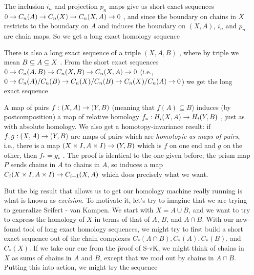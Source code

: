 
The inclusion $i_n$ and projection  $p_n$ maps give us short exact sequences \hhsk
$0\rightarrow C_n(A)\rightarrow C_n(X) \rightarrow C_n(X,A)\rightarrow 0$ \hhsk, and since the boundary on chains
in $X$ restricts to the boundary on $A$ and induces the boundary on $(X,A)$,
$i_n$ and $p_n$ are chain maps. So we get a long exact homology sequence

\ssk


\ssk

There is also a long exact sequence of a triple $(X,A,B)$ , where by triple we
mean $B\subseteq A\subseteq X$ . From the short exact sequences 
\hhsk $0\rightarrow C_n(A,B) \rightarrow C_n(X,B) \rightarrow C_n(X,A)\rightarrow 0$ \hhsk
(i.e., $0\rightarrow C_n(A)/C_n(B) \rightarrow C_n(X)/C_n(B) \rightarrow C_n(X)/C_n(A)\rightarrow 0$) we get the
long exact sequence 

\ssk


\msk

A map of pairs $f: (X,A) \rightarrow (Y,B)$ (meaning that $f(A)\subseteq B$)
induces (by postcomposition) a map of relative homology $f_*:H_i(X,A)\rightarrow H_i(Y,B)$ , just as with 
absolute homology.
We also get a homotopy-invariance result: if $f,g: (X,A) \rightarrow (Y,B)$ are maps of pairs
which are {\it homotopic as maps of pairs},
i.e., there is a map $(X\times I,A\times I)\rightarrow (Y,B)$ which is $f$ on one end and $g$
on the other, then $f_*=g_*$ . The proof is identical to the one given before; the prism map 
$P$ sends chains in $A$ to chains in $A$, so induces a map $C_i(X\times I,A\times I)\rightarrow C_{i+1}(X,A)$
which does precisely what we want.

\bsk

But the big result that allows us to get our homology machine really running is what is
known as {\it excision}. To motivate it, let's try to imagine that we are trying to 
generalize Seifert - van Kampen. We start with $X=A\cup B$, and we want to try to 
express the homology of $X$ in terms of that of $A$, $B$, and $A\cap B$. With our
new-found tool of long exact homology sequences, we might try to first build
a short exact sequence out of the chain complexes $C_*(A\cap B), C_*(A), C_*(B)$, and $C_*(X)$.
If we take our cue from the \u{proof} of S-vK, we might think of chains in $X$ as sums of 
chains in $A$ and $B$, except that we mod out by chains in $A\cap B$. Putting this into action,
we might try the sequence

